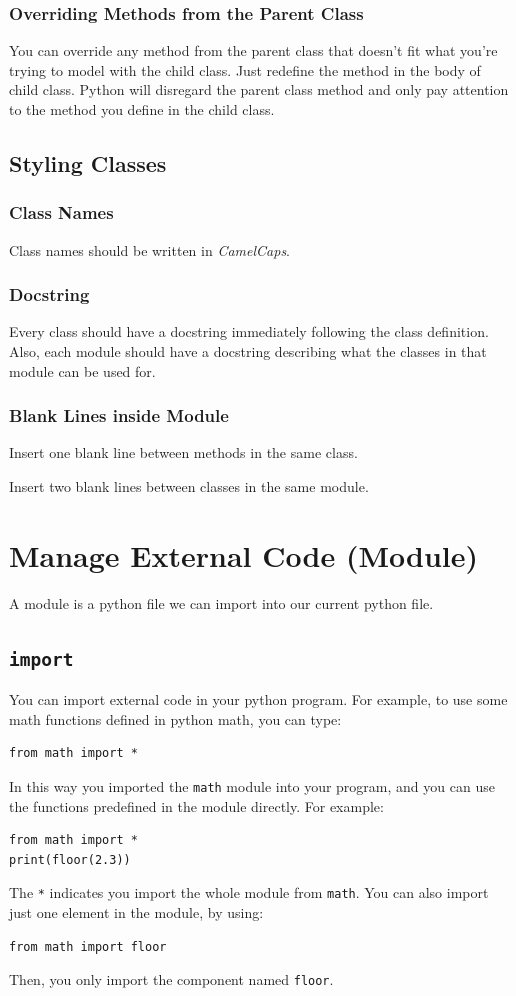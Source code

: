 \documentclass[12pt]{book}
\begin{document}
\subsection{Overriding Methods from the Parent Class}
\label{sec:orge32bcfa}
You can override any method from the parent class that doesn't fit what you're trying to model with the child class. Just redefine the method in the body of child class. Python will disregard the parent class method and only pay attention to the method you define in the child class.
\section{Styling Classes}
\label{sec:org749d24e}
\subsection{Class Names}
\label{sec:org7b29efb}
Class names should be written in \emph{CamelCaps}.
\subsection{Docstring}
\label{sec:org7762c56}
Every class should have a docstring immediately following the class definition. Also, each module should have a docstring describing what the classes in that module can be used for.
\subsection{Blank Lines inside Module}
\label{sec:org2950713}
Insert one blank line between methods in the same class.

Insert two blank lines between classes in the same module.
\chapter{Manage External Code (Module)}
\label{sec:org54de4c2}
A module is a python file we can import into our current python file.
\section{\texttt{import}}
\label{sec:orgee39d2f}
You can import external code in your python program. For example, to use some math functions defined in python math, you can type:
\begin{verbatim}
from math import *
\end{verbatim}
In this way you imported the \texttt{math} module into your program, and you can use the functions predefined in the module directly. For example:
\begin{verbatim}
from math import *
print(floor(2.3))
\end{verbatim}
The \texttt{*} indicates you import the whole module from \texttt{math}. You can also import just one element in the module, by using:
\begin{verbatim}
from math import floor
\end{verbatim}
Then, you only import the component named \texttt{floor}.
\end{document}
